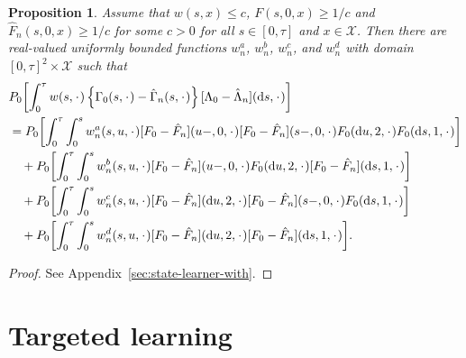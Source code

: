 \documentclass{statsoc}
\numberwithin{theorem}{section}
\newtheorem{proposition}[theorem]{Proposition}
\newcommand{\blank}{\makebox[1ex]{\textbf{$\cdot$}}}
\newcommand*\diff{\mathop{}\!\mathrm{d}}
\newcommand{\1}{\mathds{1}}
\begin{document}
\begin{proposition}
  \label{prop:dr-structure}
  Assume that \( w(s,x)\leq c \), \( F(s, 0, x) \geq 1/c \) and
  \( \hat{F}_n(s, 0, x) \geq 1/c \) for some \( c>0 \) for all
  \( s \in [0, \tau] \) and \( x \in \mathcal{X} \). Then there are real-valued
  uniformly bounded functions \( w^a_n \), \( w^b_n \), \( w^c_n \), and
  \( w^d_n \) with domain \( [0,\tau]^2 \times \mathcal{X} \) such that
  \begin{align*}
    & P_0{\left[
      \int_0^{\tau} w(s, \blank)
      \left\{
      \Gamma_0(s,\blank) -\hat{\Gamma}_n(s,\blank)
      \right\}
      [\Lambda_0-\hat{\Lambda}_n]
      (\diff s, \blank)
      \right]}
    \\
    & =
      P_0{\left[
      \int_0^{\tau} \int_0^{s} w^a_n(s,u,\blank) [F_0 - \hat{F}_n](u-, 0, \blank)[F_0 - \hat{F}_n](s-, 0, \blank) F_0(\diff u, 2, \blank ) F_0 ( \diff s, 1, \blank)
      \right]}
    \\
    & \quad +
      P_0{\left[
      \int_0^{\tau} \int_0^{s} w^b_n(s,u,\blank) [F_0 - \hat{F}_n](u-, 0, \blank)
      F_0(\diff u, 2, \blank ) [F_0 - \hat{F}_n](\diff s, 1, \blank)
      \right]}
    \\
    & \quad +
      P_0{\left[
      \int_0^{\tau} \int_0^{s} w^c_n(s,u,\blank) [F_0 - \hat{F}_n](\diff u, 2, \blank)
      [F_0 - \hat{F}_n](s-, 0, \blank)
      F_0(\diff s, 1, \blank ) 
      \right]}
    \\
    & \quad +
      P_0{\left[
      \int_0^{\tau} \int_0^{s} w^d_n(s,u,\blank) [F_0 - \hat{F}_n](\diff u, 2, \blank)
      [F_0 - \hat{F}_n](\diff s, 1, \blank)
      \right]}.
  \end{align*}
\end{proposition}
\begin{proof}
  See Appendix~\ref{sec:state-learner-with}.
\end{proof}

\section{Targeted learning}
\label{sec:targeted-learning}
\end{document}
